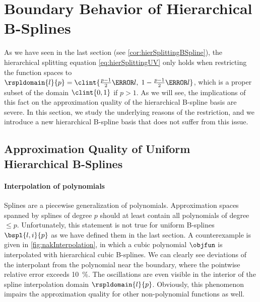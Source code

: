 \section{Boundary Behavior of Hierarchical B-Splines}
\label{sec:32notAKnot}


\noindent
As we have seen in the last section (see \cref{cor:hierSplittingBSpline}),
the hierarchical splitting equation \eqref{eq:hierSplittingUV}
only holds when restricting the function spaces to
$\rspldomain{l}{p} =
\clint{\tfrac{p-1}{2} \ms{l},\; 1 - \tfrac{p-1}{2} \ms{l}}$,
which is a proper subset of the domain $\clint{0, 1}$ if $p > 1$.
As we will see, the implications of this fact on the approximation quality
of the hierarchical B-spline basis are severe.
In this section, we study the underlying reasons of the restriction, and
we introduce a new hierarchical B-spline basis
that does not suffer from this issue.



\subsection{Approximation Quality of Uniform Hierarchical B-Splines}
\label{sec:321approximation}


\paragraph{Interpolation of polynomials}

Splines are a piecewise generalization of polynomials.
Approximation spaces spanned by splines of degree $p$ should
at least contain all polynomials of degree $\le p$.
Unfortunately, this statement is not true for uniform B-splines
$\bspl{l,i}{p}$ as we have defined them in the last section.
A counterexample is given in \cref{fig:nakInterpolation},
in which a cubic polynomial $\objfun$ is interpolated with
hierarchical cubic B-splines.
We can clearly see deviations of the interpolant from the polynomial
near the boundary,
where the pointwise relative error exceeds \SI{10}{\percent}.
The oscillations are even visible in the interior of the
spline interpolation domain $\rspldomain{l}{p}$.
Obviously, this phenomenon impairs the approximation quality
for other non-polynomial functions as well.


